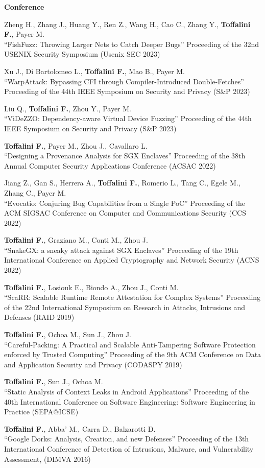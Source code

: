 \textbf{Conference}\begin{enumerate}[label={[C\arabic*]},leftmargin=5mm]
\item Zheng H., Zhang J., Huang Y., Ren Z., Wang H., Cao C., Zhang Y., \textbf{Toffalini F.}, Payer M.\\``FishFuzz: Throwing Larger Nets to Catch Deeper Bugs'' Proceeding of the 32nd USENIX Security Symposium (Usenix SEC 2023)
\item Xu J., Di Bartolomeo L., \textbf{Toffalini F.}, Mao B., Payer M.\\``WarpAttack: Bypassing CFI through Compiler-Introduced Double-Fetches'' Proceeding of the 44th IEEE Symposium on Security and Privacy (S\&P 2023)
\item Liu Q., \textbf{Toffalini F.}, Zhou Y., Payer M.\\``ViDeZZO: Dependency-aware Virtual Device Fuzzing'' Proceeding of the 44th IEEE Symposium on Security and Privacy (S\&P 2023)
\item \textbf{Toffalini F.}, Payer M., Zhou J., Cavallaro L.\\``Designing a Provenance Analysis for SGX Enclaves'' Proceeding of the 38th Annual Computer Security Applications Conference (ACSAC 2022)
\item Jiang Z., Gan S., Herrera A., \textbf{Toffalini F.}, Romerio L., Tang C., Egele M., Zhang C., Payer M.\\``Evocatio: Conjuring Bug Capabilities from a Single PoC'' Proceeding of the ACM SIGSAC Conference on Computer and Communications Security (CCS 2022)
\item \textbf{Toffalini F.}, Graziano M., Conti M., Zhou J.\\``SnakeGX: a sneaky attack against SGX Enclaves'' Proceeding of the 19th International Conference on Applied Cryptography and Network Security (ACNS 2022)
\item \textbf{Toffalini F.}, Losiouk E., Biondo A., Zhou J., Conti M.\\``ScaRR: Scalable Runtime Remote Attestation for Complex Systems'' Proceeding of the 22nd International Symposium on Research in Attacks, Intrusions and Defenses (RAID 2019)
\item \textbf{Toffalini F.}, Ochoa M., Sun J., Zhou J.\\``Careful-Packing: A Practical and Scalable Anti-Tampering Software Protection enforced by Trusted Computing'' Proceeding of the 9th ACM Conference on Data and Application Security and Privacy (CODASPY 2019)
\item \textbf{Toffalini F.}, Sun J., Ochoa M.\\``Static Analysis of Context Leaks in Android Applications'' Proceeding of the 40th International Conference on Software Engineering: Software Engineering in Practice (SEPA@ICSE)
\item \textbf{Toffalini F.}, Abba' M., Carra D., Balzarotti D.\\``Google Dorks: Analysis, Creation, and new Defenses'' Proceeding of the 13th International Conference of Detection of Intrusions, Malware, and Vulnerability Assessment, (DIMVA 2016)
\end{enumerate}
